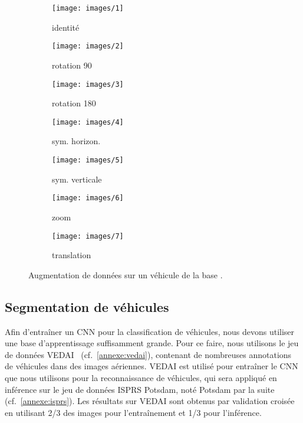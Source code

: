 \begin{figure}[t]
	\begin{subfigure}{0.142\textwidth}
    	\texttt{[image: images/1]}
        \caption*{identité}
    \end{subfigure}%
    \begin{subfigure}{0.142\textwidth}
    	\texttt{[image: images/2]}
        \caption*{rotation 90\degre}
    \end{subfigure}%
    \begin{subfigure}{0.142\textwidth}
    	\texttt{[image: images/3]}
        \caption*{rotation 180\degre}
    \end{subfigure}%
    \begin{subfigure}{0.142\textwidth}
    	\texttt{[image: images/4]}
        \caption*{sym. horizon.}
    \end{subfigure}%
    \begin{subfigure}{0.142\textwidth}
    	\texttt{[image: images/5]}
        \caption*{sym. verticale}
    \end{subfigure}%
    \begin{subfigure}{0.142\textwidth}
    	\texttt{[image: images/6]}
        \caption*{zoom}
    \end{subfigure}%
    \begin{subfigure}{0.142\textwidth}
    	\texttt{[image: images/7]}
        \caption*{translation}
    \end{subfigure}
    \caption{Augmentation de données sur un véhicule de la base .}
    \label{fig:augmented_car}
\end{figure}

\subsection{Segmentation de véhicules}

Afin d'entraîner un \gls{CNN} pour la classification de véhicules, nous devons utiliser une base d'apprentissage suffisamment grande. Pour ce faire, nous utilisons le jeu de données \gls{VEDAI}~\cite{razakarivony_vehicle_2016} (cf.~\cref{annexe:vedai}), contenant de nombreuses annotations de véhicules dans des images aériennes. \gls{VEDAI} est utilisé pour entraîner le \gls{CNN} que nous utilisons pour la reconnaissance de véhicules, qui sera appliqué en inférence sur le jeu de données \gls{ISPRS} Potsdam, noté Potsdam par la suite (cf.~\cref{annexe:isprs}). Les résultats sur \gls{VEDAI} sont obtenus par validation croisée en utilisant 2/3 des images pour l'entraînement et 1/3 pour l'inférence.

